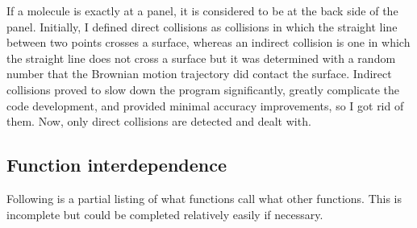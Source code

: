 \documentclass {book}
\begin{document}
If a molecule is exactly at a panel, it is considered to be at the back side of the panel. Initially, I defined direct collisions as collisions in which the straight line between two points crosses a surface, whereas an indirect collision is one in which the straight line does not cross a surface but it was determined with a random number that the Brownian motion trajectory did contact the surface. Indirect collisions proved to slow down the program significantly, greatly complicate the code development, and provided minimal accuracy improvements, so I got rid of them. Now, only direct collisions are detected and dealt with.\newline

\subsection*{Function interdependence}

Following is a partial listing of what functions call what other functions. This is incomplete but could be completed relatively easily if necessary.
\end{document}
